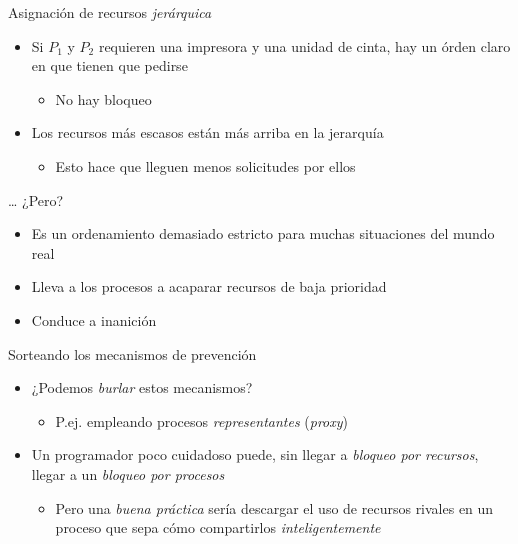 \documentclass[presentation]{beamer}
\begin{document}
\begin{frame}[label={sec:org1804ec1}]{Asignación de recursos \emph{jerárquica}}
\begin{itemize}
\item Si \(P_1\) y \(P_2\) requieren una impresora y una unidad de cinta, hay
un órden claro en que tienen que pedirse
\begin{itemize}
\item No hay bloqueo
\end{itemize}
\item Los recursos más escasos están más arriba en la jerarquía
\begin{itemize}
\item Esto hace que lleguen menos solicitudes por ellos
\end{itemize}
\end{itemize}
\begin{center}
\ldots{} ¿Pero?
\end{center}
\begin{itemize}
\item Es un ordenamiento demasiado estricto para muchas situaciones del
mundo real
\item Lleva a los procesos a acaparar recursos de baja prioridad
\item Conduce a inanición
\end{itemize}
\end{frame}

\begin{frame}[label={sec:org8bb67a2}]{Sorteando los mecanismos de prevención}
\begin{itemize}
\item ¿Podemos \emph{burlar} estos mecanismos?
\begin{itemize}
\item P.ej. empleando procesos \emph{representantes} (\emph{proxy})
\end{itemize}
\item Un programador poco cuidadoso puede, sin llegar a \emph{bloqueo por
recursos}, llegar a un \emph{bloqueo por procesos}
\begin{itemize}
\item Pero una \emph{buena práctica} sería descargar el uso de recursos
rivales en un proceso que sepa cómo compartirlos
\emph{inteligentemente}
\end{itemize}
\end{itemize}
\end{frame}
\end{document}
